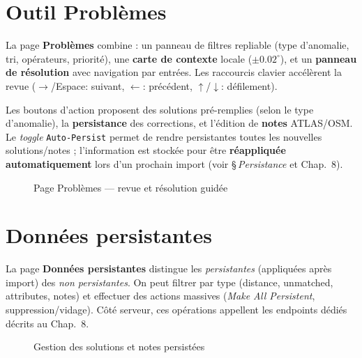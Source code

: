 \section{Outil Problèmes}

La page \textbf{Problèmes} combine : un panneau de filtres repliable (type d'anomalie, tri, opérateurs, priorité), une \textbf{carte de contexte} locale (\(\pm 0.02^\circ\)), et un \textbf{panneau de résolution} avec navigation par entrées. Les raccourcis clavier accélèrent la revue (\(\rightarrow\)/Espace: suivant, \(\leftarrow\): précédent, \(\uparrow\)/\(\downarrow\): défilement).

Les boutons d'action proposent des solutions pré-remplies (selon le type d'anomalie), la \textbf{persistance} des corrections, et l'édition de \textbf{notes} ATLAS/OSM. Le \textit{toggle} \texttt{Auto-Persist} permet de rendre persistantes toutes les nouvelles solutions/notes ; l'information est stockée pour être \textbf{réappliquée automatiquement} lors d'un prochain import (voir \S\,\emph{Persistance} et Chap.~8).

\begin{figure}[h]
  \centering
  \caption{Page Problèmes — revue et résolution guidée}
  \label{fig:frontend-problems}
\end{figure}

\section{Données persistantes}

La page \textbf{Données persistantes} distingue les \textit{persistantes} (appliquées après import) des \textit{non persistantes}. On peut filtrer par type (distance, unmatched, attributes, notes) et effectuer des actions massives (\textit{Make All Persistent}, suppression/vidage). Côté serveur, ces opérations appellent les endpoints dédiés décrits au Chap.~8.

\begin{figure}[h]
  \centering
  \caption{Gestion des solutions et notes persistées}
  \label{fig:frontend-persistent}
\end{figure}

